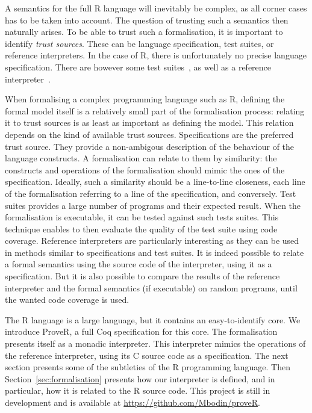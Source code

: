 \documentclass[9pt, sigplan, natbib=false, screen=true]{acmart}
\newcommand\Coq{Coq}
\newcommand\R{R}
\newcommand\Cn{C}
\begin{document}
A semantics for the full \R{} language will inevitably
be complex, as all corner cases has to be taken into account.
The question of trusting such a semantics
then naturally arises.
%
To be able to trust such a formalisation,
it is important to identify \emph{trust sources}.
These can be language specification,
test suites,
or reference interpreters.
In the case of \R{}, there is unfortunately
no precise language specification.
There are however some test suites~\parencite{2014testr, maj2013testr},
as well as a reference interpreter~\parencite{team2000r}.

When formalising a complex programming language such as \R{},
defining the formal model itself
is a relatively small part of the formalisation process:
relating it to trust sources
is as least as important as defining the model.
This relation depends on the kind of available trust sources.
%
Specifications are the preferred trust source.
They provide a non-ambigous description of the behaviour of the language constructs.
A formalisation can relate to them by similarity:
the constructs and operations of the formalisation should mimic the ones
of the specification.
Ideally, such a similarity should be a line-to-line closeness,
each line of the formalisation referring to a line of the specification,
and conversely.
%
Test suites provides a large number of programs and their expected result.
When the formalisation is executable, it can be tested against such tests suites.
This technique enables to then evaluate the quality of the test suite
using code coverage.
%
Reference interpreters are particularly interesting as
they can be used in methods similar to specifications and test suites.
It is indeed possible to relate a formal semantics
using the source code of the interpreter,
using it as a specification.
But it is also possible to compare the results of the reference interpreter
and the formal semantics (if executable) on random programs,
until the wanted code coverage is used.

The \R{} language is a large language,
but it contains an easy-to-identify core.
We introduce ProveR, a full \Coq{} specification for this core.
The formalisation presents itself as a monadic interpreter.
This interpreter mimics the operations of the reference interpreter,
using its \Cn{} source code as a specification.
%
The next section presents some of the subtleties of the \R{} programming language.
Then Section~\ref{sec:formalisation} presents how our interpreter is defined,
and in particular, how it is related to the \R{} source code.
This project is still in development
and is available at \url{https://github.com/Mbodin/proveR}.
\end{document}
